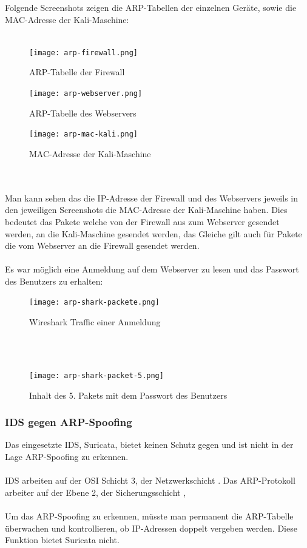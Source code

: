 \documentclass[
    a4paper,
    pagesize,
	pdftex,
    12pt,
]{scrartcl}
\begin{document}
Folgende Screenshots zeigen die ARP-Tabellen der einzelnen Geräte, sowie die MAC-Adresse der Kali-Maschine: \\ \\
\begin{figure}[!ht]
	\centering
	\texttt{[image: arp-firewall.png]}
	\caption{ARP-Tabelle der Firewall}
	\label{fig:arp-firewall}
\end{figure}
\begin{figure}[!ht]
	\centering
	\texttt{[image: arp-webserver.png]}
	\caption{ARP-Tabelle des Webservers}
	\label{fig:arp-webserver}
\end{figure}
\begin{figure}[!ht]
	\centering
	\texttt{[image: arp-mac-kali.png]}
	\caption{MAC-Adresse der Kali-Maschine}
	\label{fig:arp-mac-kali}
\end{figure} 
\\ \\
Man kann sehen das die IP-Adresse der Firewall und des Webservers jeweils in den jeweiligen Screenshots die MAC-Adresse der Kali-Maschine haben. Dies bedeutet das Pakete welche von der Firewall aus zum Webserver gesendet werden, an die Kali-Maschine gesendet werden, das Gleiche gilt auch für Pakete die vom Webserver an die Firewall gesendet werden.
\\ \\
Es war möglich eine Anmeldung auf dem Webserver zu lesen und das Passwort des Benutzers zu erhalten:
\begin{figure}[!ht]
	\centering
	\texttt{[image: arp-shark-packete.png]}
	\caption{Wireshark Traffic einer Anmeldung}
	\label{fig:arp-shark-packete.png}
\end{figure}
\\ \\
\begin{figure}[!ht]
	\centering
	\texttt{[image: arp-shark-packet-5.png]}
	\caption{Inhalt des 5. Pakets mit dem Passwort des Benutzers}
	\label{fig:arp-shark-packet-5}
\end{figure} 

\subsubsection{IDS gegen ARP-Spoofing}
Das eingesetzte IDS, Suricata, bietet keinen Schutz gegen und ist nicht in der Lage ARP-Spoofing zu erkennen. \\ \\
IDS arbeiten auf der OSI Schicht 3, der Netzwerkschicht \cite{layer-ids}. Das ARP-Protokoll arbeiter auf der Ebene 2, der Sicherungsschicht \cite{layer-arp},\\ \\
Um das ARP-Spoofing zu erkennen, müsste man permanent die ARP-Tabelle überwachen und kontrollieren, ob IP-Adressen doppelt vergeben werden. Diese Funktion bietet Suricata nicht.
\end{document}
